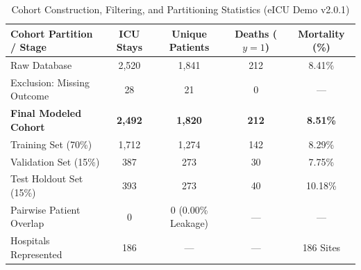 \begin{table}[t]
\centering
\caption{Cohort Construction, Filtering, and Partitioning Statistics (eICU Demo v2.0.1)}
\label{tab:cohort_statistics}
\begin{tabular}{lcccc}
\hline
\textbf{Cohort Partition / Stage} & \textbf{ICU Stays} & \textbf{Unique Patients} & \textbf{Deaths ($y=1$)} & \textbf{Mortality (\%)} \\
\hline
Raw Database & 2,520 & 1,841 & 212 & 8.41\% \\
Exclusion: Missing Outcome & 28 & 21 & 0 & --- \\
\textbf{Final Modeled Cohort} & \textbf{2,492} & \textbf{1,820} & \textbf{212} & \textbf{8.51\%} \\
\hline
Training Set (70\%) & 1,712 & 1,274 & 142 & 8.29\% \\
Validation Set (15\%) & 387 & 273 & 30 & 7.75\% \\
Test Holdout Set (15\%) & 393 & 273 & 40 & 10.18\% \\
\hline
Pairwise Patient Overlap & 0 & 0 (0.00\% Leakage) & --- & --- \\
Hospitals Represented & 186 & --- & --- & 186 Sites \\
\hline
\end{tabular}
\end{table}
